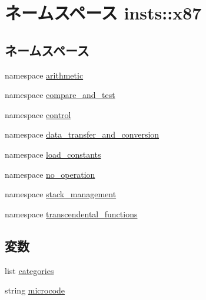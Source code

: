 \hypertarget{namespaceinsts_1_1x87}{
\section{ネームスペース insts::x87}
\label{namespaceinsts_1_1x87}
}
\subsection*{ネームスペース}
\begin{DoxyCompactItemize}
\item 
namespace \hyperlink{namespaceinsts_1_1x87_1_1arithmetic}{arithmetic}
\item 
namespace \hyperlink{namespaceinsts_1_1x87_1_1compare__and__test}{compare\_\-and\_\-test}
\item 
namespace \hyperlink{namespaceinsts_1_1x87_1_1control}{control}
\item 
namespace \hyperlink{namespaceinsts_1_1x87_1_1data__transfer__and__conversion}{data\_\-transfer\_\-and\_\-conversion}
\item 
namespace \hyperlink{namespaceinsts_1_1x87_1_1load__constants}{load\_\-constants}
\item 
namespace \hyperlink{namespaceinsts_1_1x87_1_1no__operation}{no\_\-operation}
\item 
namespace \hyperlink{namespaceinsts_1_1x87_1_1stack__management}{stack\_\-management}
\item 
namespace \hyperlink{namespaceinsts_1_1x87_1_1transcendental__functions}{transcendental\_\-functions}
\end{DoxyCompactItemize}
\subsection*{変数}
\begin{DoxyCompactItemize}
\item 
list \hyperlink{namespaceinsts_1_1x87_a273cf0f1630af14c1582f05e53354a55}{categories}
\item 
string \hyperlink{namespaceinsts_1_1x87_a770f11a173e99389a8802f0107ed8f52}{microcode}
\end{DoxyCompactItemize}


